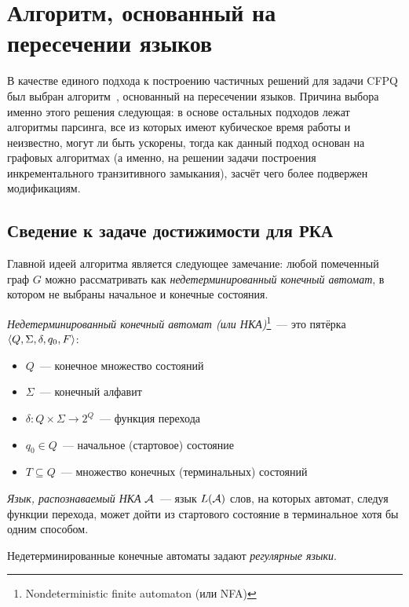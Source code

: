 \section{Алгоритм, основанный на пересечении языков}\label{section:algo_idea}

В качестве единого подхода к построению частичных решений для задачи CFPQ был выбран алгоритм~\cite{Chaudhuri08, Orachev20}, основанный на пересечении языков. Причина выбора именно этого решения следующая: в основе остальных подходов лежат алгоритмы парсинга, все из которых имеют кубическое время работы и неизвестно, могут ли быть ускорены, тогда как данный подход основан на графовых алгоритмах (а именно, на решении задачи построения инкрементального транзитивного замыкания), засчёт чего более подвержен модификациям.


\subsection{Сведение к задаче достижимости для РКА}

Главной идеей алгоритма является следующее замечание: любой помеченный граф $G$ можно рассматривать как \textit{недетерминированный конечный автомат}, в котором не выбраны начальное и конечные состояния.

\begin{definition}

  \textit{Недетерминированный конечный автомат (или НКА)}\footnote{Nondeterministic finite automaton (или NFA)}~--- это пятёрка $\langle Q, \Sigma, \delta, q_0, F \rangle$:
  \vspace{-\topsep}
  \begin{itemize}
    \setlength\itemsep{-0.1em}
    \item $Q$~--- конечное множество состояний
    \item $\Sigma$~--- конечный алфавит
    \item $\delta \colon Q \times \Sigma \to 2^Q$~--- функция перехода
    \item $q_0 \in Q$~--- начальное (стартовое) состояние
    \item $T \subseteq Q$~--- множество конечных (терминальных) состояний
  \end{itemize}

  \textit{Язык, распознаваемый НКА} $\mathcal{A}$~--- язык $L(\mathcal{A})$ слов, на которых автомат, следуя функции перехода, может дойти из стартового состояние в терминальное хотя бы одним способом.

  Недетерминированные конечные автоматы задают \textit{регулярные языки}.

\end{definition}

